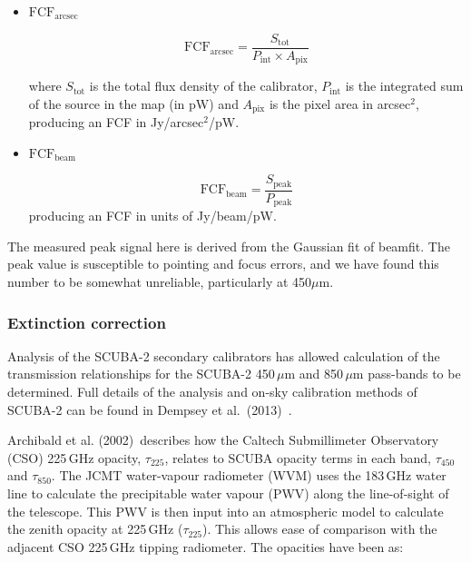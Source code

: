 \documentclass[twoside,11pt]{article}
\newcommand{\xlabel}[1]{}
\renewcommand{\_}{\texttt{\symbol{95}}}
\newcommand{\fcfb}{$\mathrm{FCF_{beam}}$}
\newcommand{\fcfa}{$\mathrm{FCF_{arcsec}}$}
\newcommand{\task}[1]{\textsf{#1}}
\begin{document}
\begin{itemize}

\item{\textbf{\fcfa}}

\begin{equation}
\label{eq:fcf_arcsec}
\mathrm{FCF_{arcsec}} = \frac{S_\mathrm{tot}}{P_\mathrm{int} \times
A_\mathrm{pix}}
\end{equation}

where $S_\mathrm{tot}$ is the total flux density of the calibrator,
$P_\mathrm{int}$ is the integrated sum of the source in the map (in
pW) and $A_\mathrm{pix}$ is the pixel area in arcsec$^2$, producing an
FCF in Jy/arcsec$^2$/pW.

\item{\textbf{\fcfb}}

\begin{equation}
\label{eq:fcf_beam}
\mathrm{FCF_{beam}} = \frac{S_\mathrm{{peak}}}{P_\mathrm{peak}}
\end{equation}
producing an FCF in units of Jy/beam/pW.
\end{itemize}

The measured peak signal here is derived from the Gaussian fit of
\task{beamfit}. The peak value is susceptible to pointing and focus errors,
and we have found this number to be somewhat unreliable, particularly
at 450$\mu$m.


\subsubsection{\xlabel{extinction}Extinction correction}

Analysis of the SCUBA-2 secondary calibrators has allowed calculation
of the transmission relationships for the SCUBA-2 450\,$\mu$m and
850\,$\mu$m pass-bands to be determined. Full details of the analysis
and on-sky calibration methods of SCUBA-2 can be found in Dempsey et
al.\ (2013)~\cite{dempsey12}\cite{dempsey-spie}.

Archibald et al. (2002)\,\cite{archibald} describes how the Caltech
Submillimeter Observatory (CSO) 225\,GHz opacity, $\tau_{225}$,
relates to SCUBA opacity terms in each band, $\tau_{450}$ and
$\tau_{850}$. The JCMT water-vapour radiometer (WVM) uses the 183\,GHz
water line to calculate the precipitable water vapour (PWV) along the
line-of-sight of the telescope. This PWV is then input into an
atmospheric model to calculate the zenith opacity at 225\,GHz
($\tau_{225}$). This allows ease of comparison with the adjacent CSO
225\,GHz tipping radiometer. The opacities have been as:
\end{document}
